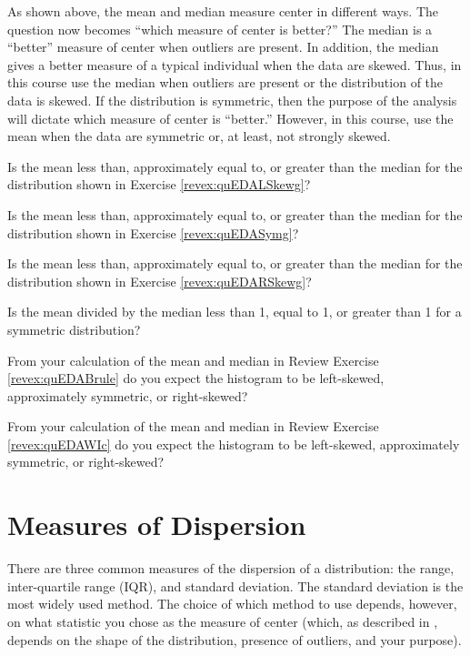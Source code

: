 \documentclass[10pt,openany]{book}\usepackage[]{graphicx}\usepackage[]{color}
\begin{document}
As shown above, the mean and median measure center in different ways.  The question now becomes ``which measure of center is better?''  The median is a ``better'' measure of center when outliers are present.  In addition, the median gives a better measure of a typical individual when the data are skewed.  Thus, in this course use the median when outliers are present or the distribution of the data is skewed.  If the distribution is symmetric, then the purpose of the analysis will dictate which measure of center is ``better.''  However, in this course, use the mean when the data are symmetric or, at least, not strongly skewed.


\vspace{-12pt}
\begin{exsection}
  \item \label{revex:quEDALSkewMM}Is the mean less than, approximately equal to, or greater than the median for the distribution shown in Exercise \ref{revex:quEDALSkewg}? 
  \item \label{revex:quEDAAsymMM}Is the mean less than, approximately equal to, or greater than the median for the distribution shown in Exercise \ref{revex:quEDASymg}? 
  \item \label{revex:quEDARSkewMM}Is the mean less than, approximately equal to, or greater than the median for the distribution shown in Exercise \ref{revex:quEDARSkewg}? 
  \item \label{revex:quEDARatio} Is the mean divided by the median less than 1, equal to 1, or greater than 1 for a symmetric distribution? 
  \item \label{revex:quEDABruleMM} From your calculation of the mean and median in Review Exercise  \ref{revex:quEDABrule} do you expect the histogram to be left-skewed, approximately symmetric, or right-skewed? 
  \item \label{revex:quEDAWIcMM} From your calculation of the mean and median in Review Exercise \ref{revex:quEDAWIc} do you expect the histogram to be left-skewed, approximately symmetric, or right-skewed? 
\end{exsection}


\section{Measures of Dispersion}
There are three common measures of the dispersion of a distribution: the range, inter-quartile range (IQR), and standard deviation.  The standard deviation is the most widely used method.  The choice of which method to use depends, however, on what statistic you chose as the measure of center (which, as described in , depends on the shape of the distribution, presence of outliers, and your purpose).
\end{document}
